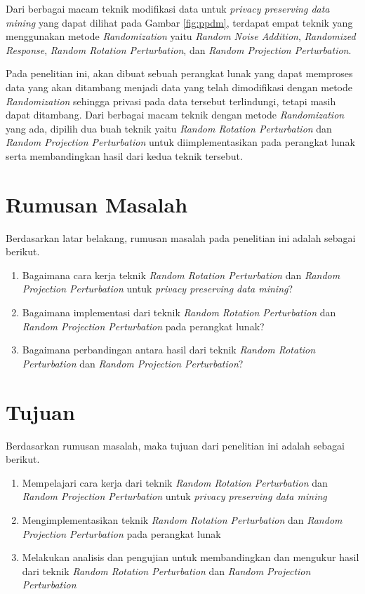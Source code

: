 \documentclass[a4paper,twoside]{article}
\begin{document}
Dari berbagai macam teknik modifikasi data untuk \textit{privacy preserving data mining} yang dapat dilihat pada Gambar \ref{fig:ppdm}, terdapat empat teknik yang menggunakan metode \textit{Randomization} yaitu \textit{Random Noise Addition}, \textit{Randomized Response}, \textit{Random Rotation Perturbation}, dan \textit{Random Projection Perturbation}.

Pada penelitian ini, akan dibuat sebuah perangkat lunak yang dapat memproses data yang akan ditambang menjadi data yang telah dimodifikasi dengan metode \textit{Randomization} sehingga privasi pada data tersebut terlindungi, tetapi masih dapat ditambang. Dari berbagai macam teknik dengan metode \textit{Randomization} yang ada, dipilih dua buah teknik yaitu \textit{Random Rotation Perturbation} dan \textit{Random Projection Perturbation} untuk diimplementasikan pada perangkat lunak serta membandingkan hasil dari kedua teknik tersebut.

\section{Rumusan Masalah}
Berdasarkan latar belakang, rumusan masalah pada penelitian ini adalah sebagai berikut.
\begin{enumerate}
	\item Bagaimana cara kerja teknik \textit{Random Rotation Perturbation} dan \textit{Random Projection Perturbation} untuk \textit{privacy preserving data mining}?
	\item Bagaimana implementasi dari teknik \textit{Random Rotation Perturbation} dan \textit{Random Projection Perturbation} pada perangkat lunak?
	\item Bagaimana perbandingan antara hasil dari teknik \textit{Random Rotation Perturbation} dan \textit{Random Projection Perturbation}?
\end{enumerate}

\section{Tujuan}
Berdasarkan rumusan masalah, maka tujuan dari penelitian ini adalah sebagai berikut.
\begin{enumerate}
	\item Mempelajari cara kerja dari teknik \textit{Random Rotation Perturbation} dan \textit{Random Projection Perturbation} untuk \textit{privacy preserving data mining}
	\item Mengimplementasikan teknik \textit{Random Rotation Perturbation} dan \textit{Random Projection Perturbation} pada perangkat lunak
	\item Melakukan analisis dan pengujian untuk membandingkan dan mengukur hasil dari teknik \textit{Random Rotation Perturbation} dan \textit{Random Projection Perturbation}
\end{enumerate}
\end{document}
